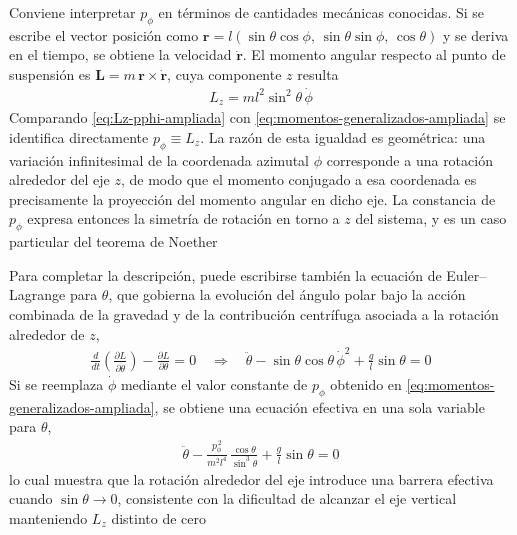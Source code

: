 \documentclass{article}
\begin{document}
Conviene interpretar $p_\phi$ en términos de cantidades mecánicas conocidas. Si se escribe el vector posición como $\mathbf r = l(\sin\theta\cos\phi,\,\sin\theta\sin\phi,\,\cos\theta)$ y se deriva en el tiempo, se obtiene la velocidad $\dot{\mathbf r}$. El momento angular respecto al punto de suspensión es $\mathbf L = m\,\mathbf r \times \dot{\mathbf r}$, cuya componente $z$ resulta
\begin{equation}
\begin{split}
L_z = m l^2 \sin^2\theta\,\dot\phi
\end{split}\label{eq:Lz-pphi-ampliada}
\end{equation}
Comparando \eqref{eq:Lz-pphi-ampliada} con \eqref{eq:momentos-generalizados-ampliada} se identifica directamente $p_\phi \equiv L_z$. La razón de esta igualdad es geométrica: una variación infinitesimal de la coordenada azimutal $\phi$ corresponde a una rotación alrededor del eje $z$, de modo que el momento conjugado a esa coordenada es precisamente la proyección del momento angular en dicho eje. La constancia de $p_\phi$ expresa entonces la simetría de rotación en torno a $z$ del sistema, y es un caso particular del teorema de Noether

Para completar la descripción, puede escribirse también la ecuación de Euler–Lagrange para $\theta$, que gobierna la evolución del ángulo polar bajo la acción combinada de la gravedad y de la contribución centrífuga asociada a la rotación alrededor de $z$,
\begin{equation}
\begin{split}
\frac{d}{dt}\!\left(\frac{\partial L}{\partial \dot\theta}\right) - \frac{\partial L}{\partial \theta} = 0
\quad\Longrightarrow\quad
\ddot\theta - \sin\theta\cos\theta\,\dot\phi^2 + \frac{g}{l}\sin\theta = 0
\end{split}\label{eq:EL-theta-ampliada}
\end{equation}
Si se reemplaza $\dot\phi$ mediante el valor constante de $p_\phi$ obtenido en \eqref{eq:momentos-generalizados-ampliada}, se obtiene una ecuación efectiva en una sola variable para $\theta$,
\begin{equation}
\begin{split}
\ddot\theta - \frac{p_\phi^{\,2}}{m^2 l^4}\,\frac{\cos\theta}{\sin^3\theta} + \frac{g}{l}\sin\theta = 0
\end{split}\label{eq:theta-efectiva-ampliada}
\end{equation}
lo cual muestra que la rotación alrededor del eje introduce una barrera efectiva cuando $\sin\theta \to 0$, consistente con la dificultad de alcanzar el eje vertical manteniendo $L_z$ distinto de cero
\end{document}
